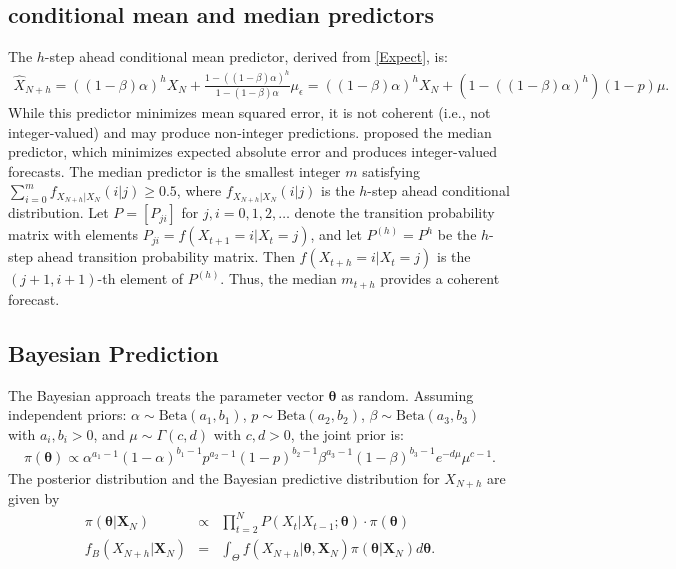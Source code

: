 \documentclass[twoside]{article}
\begin{document}
\subsection{conditional mean and median predictors }
The $h$-step ahead conditional mean predictor, derived from \eqref{Expect}, is:
\begin{eqnarray*}
\hat{X}_{N+h} = ((1-\beta)\alpha)^h X_N + \frac{1-((1-\beta)\alpha)^h}{1-(1-\beta)\alpha}\mu_\epsilon = ((1-\beta)\alpha)^h X_N + (1-((1-\beta)\alpha)^h)(1-p)\mu.
\end{eqnarray*}
While this predictor minimizes mean squared error, it is not coherent (i.e., not integer-valued) and may produce non-integer predictions. \cite{Freeland:2004} proposed the median predictor, which minimizes expected absolute error and produces integer-valued forecasts. The median predictor is the smallest integer $m$ satisfying $\sum_{i=0}^m f_{X_{N+h}|X_N}(i|j) \geq 0.5$, where $f_{X_{N+h}|X_N}(i|j)$ is the $h$-step ahead conditional distribution. Let $P=[P_{ji}]$ for $j,i=0,1,2,\ldots$ denote the transition probability matrix with elements $P_{ji}=f(X_{t+1}=i|X_t=j)$, and let $P^{(h)}=P^h$ be the $h$-step ahead transition probability matrix. Then $f(X_{t+h}=i|X_t=j)$ is the $(j+1,i+1)$-th element of $P^{(h)}$. Thus, the median $m_{t+h}$ provides a coherent forecast.

\subsection{Bayesian Prediction}
The Bayesian approach treats the parameter vector $\boldsymbol{\theta}$ as random. Assuming independent priors: $\alpha\sim\text{Beta}(a_1,b_1)$, $p\sim\text{Beta}(a_2,b_2)$, $\beta\sim\text{Beta}(a_3,b_3)$ with $a_i,b_i>0$, and $\mu\sim\Gamma(c,d)$ with $c,d>0$, the joint prior is:
\begin{eqnarray*}
\pi(\boldsymbol{\theta}) \propto \alpha^{a_1-1}(1-\alpha)^{b_1-1} p^{a_2-1}(1-p)^{b_2-1} \beta^{a_3-1}(1-\beta)^{b_3-1} e^{-d\mu}\mu^{c-1}.
\end{eqnarray*}
The posterior distribution and the Bayesian predictive distribution for $X_{N+h}$ are given by
\begin{eqnarray*}
\pi(\boldsymbol{\theta}|\mathbf{X}_N) &\propto & \prod_{t=2}^N P(X_t|X_{t-1};\boldsymbol{\theta}) \cdot \pi(\boldsymbol{\theta})\\
f_B(X_{N+h}|\mathbf{X}_N) &=& \int_{\Theta} f(X_{N+h}|\boldsymbol{\theta},\mathbf{X}_N)\pi(\boldsymbol{\theta}|\mathbf{X}_N)d\boldsymbol{\theta}.
\end{eqnarray*}
\end{document}
